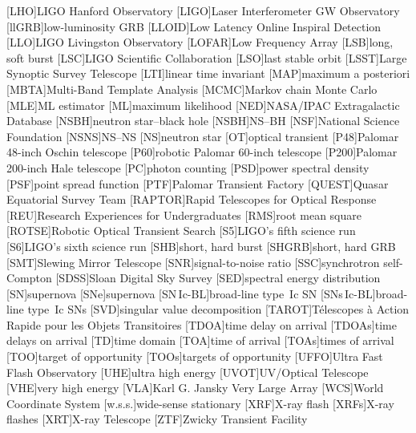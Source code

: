 \begin{acronym}
[LHO]{\ac{LIGO} Hanford Observatory}
[LIGO]{Laser Interferometer \acs{GW} Observatory}
[llGRB]{low\nobreakdashes-luminosity \ac{GRB}}
[LLOID]{Low Latency Online Inspiral Detection}
[LLO]{\ac{LIGO} Livingston Observatory}
[LOFAR]{Low Frequency Array}
[LSB]{long, soft burst}
[LSC]{\acs{LIGO} Scientific Collaboration}
[LSO]{last stable orbit}
[LSST]{Large Synoptic Survey Telescope}
[LTI]{linear time invariant}
[MAP]{maximum a posteriori}
[MBTA]{Multi-Band Template Analysis}
[MCMC]{Markov chain Monte Carlo}
[MLE]{\ac{ML} estimator}
[ML]{maximum likelihood}
[NED]{NASA/IPAC Extragalactic Database}
[NSBH]{neutron star\nobreakdashes--black hole}
[NSBH]{\acl{NS}\nobreakdashes--\acl{BH}}
[NSF]{National Science Foundation}
[NSNS]{\acl{NS}\nobreakdashes--\acl{NS}}
[NS]{neutron star}
[OT]{optical transient}
[P48]{Palomar 48\nobreakdashes-inch Oschin telescope}
[P60]{robotic Palomar 60\nobreakdashes-inch telescope}
[P200]{Palomar 200\nobreakdashes-inch Hale telescope}
[PC]{photon counting}
[PSD]{power spectral density}
[PSF]{point spread function}
[PTF]{Palomar Transient Factory}
[QUEST]{Quasar Equatorial Survey Team}
[RAPTOR]{Rapid Telescopes for Optical Response}
[REU]{Research Experiences for Undergraduates}
[RMS]{root mean square}
[ROTSE]{Robotic Optical Transient Search}
[S5]{\ac{LIGO}'s fifth science run}
[S6]{\ac{LIGO}'s sixth science run}
[SHB]{short, hard burst}
[SHGRB]{short, hard \acl{GRB}}
[SMT]{Slewing Mirror Telescope}
[SNR]{signal\nobreakdashes-to\nobreakdashes-noise ratio}
[SSC]{synchrotron self\nobreakdashes-Compton}
[SDSS]{Sloan Digital Sky Survey}
[SED]{spectral energy distribution}
[SN]{supernova}
[SNe]{supernova}
[\acs{SN}\,Ic\nobreakdashes-BL]{broad\nobreakdashes-line type~Ic \ac{SN}}
[\acsp{SN}\,Ic\nobreakdashes-BL]{broad\nobreakdashes-line type~Ic \acp{SN}}
[SVD]{singular value decomposition}
[TAROT]{T\'{e}lescopes \`{a} Action Rapide pour les Objets Transitoires}
[TDOA]{time delay on arrival}
[TDOAs]{time delays on arrival}
[TD]{time domain}
[TOA]{time of arrival}
[TOAs]{times of arrival}
[TOO]{target of opportunity}
[TOOs]{targets of opportunity}
[UFFO]{Ultra Fast Flash Observatory}
[UHE]{ultra high energy}
[UVOT]{UV/Optical Telescope}
[VHE]{very high energy}
[VLA]{Karl G. Jansky Very Large Array}
[WCS]{World Coordinate System}
[w.s.s.]{wide\nobreakdashes-sense stationary}
[XRF]{X\nobreakdashes-ray flash}
[XRFs]{X\nobreakdashes-ray flashes}
[XRT]{X\nobreakdashes-ray Telescope}
[ZTF]{Zwicky Transient Facility}
\end{acronym}
